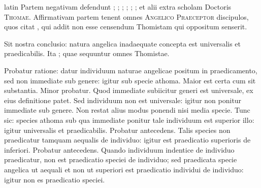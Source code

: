 \begin{otherlanguage*}{latin}
\pstart
Partem negativam defendunt ; ; ; ; ; ;  et alii extra scholam Doctoris \textsc{Thomae}. Affirmativam partem tenent omnes \textsc{Angelico Praeceptor} discipulos, quos citat , qui addit non esse censendum Thomistam qui oppositum senserit. 
\pend

\pstart
Sit nostra conclusio:
natura angelica inadaequate concepta est universalis et praedicabilis. Ita ; quae sequuntur omnes Thomistae. 
\pend

\pstart
Probatur ratione:
datur individuum naturae angelicae positum in praedicamento, sed non immediate sub genere:
igitur sub specie athoma. Maior est certa cum sit substantia. Minor probatur. Quod immediate subiicitur generi est universale, ex eius definitione patet. Sed individuum non est universale:
igitur non ponitur immediate sub genere. Non restat alius modus ponendi nisi media specie. Tunc sic:
species athoma sub qua immediate ponitur tale individuum est superior illo:
igitur universalis et praedicabilis. Probatur antecedens. Talis species non praedicatur tamquam aequalis de individuo:
igitur est praedicatio superioris de inferiori. Probatur antecedens. Quando individuum indentice de individuo praedicatur, non est praedicatio speciei de individuo; sed praedicata specie angelica ut aequali et non ut superiori est praedicatio individui de individuo:
igitur non es praedicatio speciei. 
\pend


\end{otherlanguage*}
